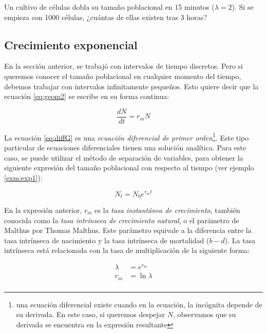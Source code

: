 \documentclass[12pt,letterpaper,]{book}
\let\rmarkdownfootnote\footnote%
\def\footnote{\protect\rmarkdownfootnote}
\let\BeginKnitrBlock\begin \let\EndKnitrBlock\end
\begin{document}
\BeginKnitrBlock{exercise}
\protect\hypertarget{exr:GeomGrowthBacteria2}{}{\label{exr:GeomGrowthBacteria2}
}Un cultivo de células dobla su tamaño poblacional en 15 minutos
(\(\lambda = 2\)). Si se empieza con 1000 células, ¿cuántas de ellas
existen tras 3 horas?
\EndKnitrBlock{exercise}

\subsection{Crecimiento exponencial}\label{crecimiento-exponencial}

En la sección anterior, se trabajó con intervalos de tiempo discretos.
Pero si queremos conocer el tamaño poblacional en cualquier momento del
tiempo, debemos trabajar con intervalos infinitamente pequeños. Esto
quiere decir que la ecuación \eqref{eq:geom2} se escribe en su forma
continua:

\begin{equation}
\frac{dN}{dt}=r_m N
 \label{eq:diffG}
 \end{equation}

La ecuación \eqref{eq:diffG} es una \emph{ecuación diferencial de primer
orden}\footnote{una ecuación diferencial existe cuando en la ecuación, la incógnita depende de su derivada. En este caso, si queremos despejar $N$, observamos que su derivada se encuentra en la expresión resultante}.
Este tipo particular de ecuaciones diferenciales tienen una solución
analítica. Para este caso, se puede utilizar el método de separación de
variables, para obtener la siguiente expresión del tamaño poblacional
con respecto al tiempo (ver ejemplo \ref{exm:exp1}):

\begin{equation}
N_t=N_0 e^{r_mt}
\label{eq:expG}
\end{equation}

En la expresión anterior, \(r_m\) es la \emph{tasa instantánea de
crecimiento}, también conocida
como la \emph{tasa intrínseca de crecimiento natural}, o el parámetro de
Malthus por Thomas Malthus. Este parámetro equivale a la diferencia
entre la tasa intrínseca de nacimiento y la tasa intrínseca de
mortalidad (\(b - d\)). La tasa intrínseca está relacionada con la tasa
de multiplicación de la siguiente forma:

\begin{equation*}
\begin{split}
\lambda &= e^{r_m}\\
r_m &= \ln\lambda\\
\end{split}
\end{equation*}
\end{document}
